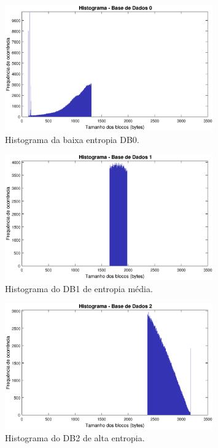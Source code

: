\begin{figure}
\centering
\includegraphics[width=0.8\textwidth]{figuras/hist0.eps}
\caption[Histograma da baixa entropia DB0.]{Histograma da baixa entropia DB0.}
\label{fig:database0}
\end{figure}

\begin{figure}
\centering
\includegraphics[width=0.80\textwidth]{figuras/hist1.eps}
\caption[Histograma do DB1 de entropia média.]{Histograma do DB1 de entropia média.}
\label{fig:database1}
\end{figure}

\begin{figure}
\centering
\includegraphics[width=0.8\textwidth]{figuras/hist2.eps}
\caption[Histograma do DB2 de alta entropia.]{Histograma do DB2 de alta entropia.}
\label{fig:database2}
\end{figure}

